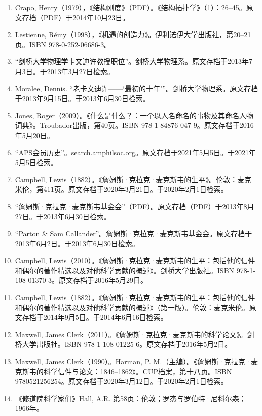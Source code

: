 \begin{enumerate}
\item Crapo, Henry（1979），《结构刚度》（PDF）。《结构拓扑学》（1）：26–45。原文存档（PDF）于2014年10月23日。  
\item Lestienne, Rémy（1998），《机遇的创造力》。伊利诺伊大学出版社，第20–21页。ISBN 978-0-252-06686-3。  
\item “剑桥大学物理学卡文迪许教授职位”。剑桥大学物理系。原文存档于2013年7月3日。于2013年3月27日检索。
\item Moralee, Dennis. “老卡文迪许——‘最初的十年’”。剑桥大学物理系。原文存档于2013年9月15日。于2013年6月30日检索。  
\item Jones, Roger（2009）。《什么是什么？：一个以人名命名的事物及其命名人物词典》。Troubador出版，第40页。ISBN 978-1-84876-047-9。原文存档于2016年5月20日。  
\item “APS会员历史”。search.amphilsoc.org。原文存档于2021年5月5日。于2021年5月5日检索。  
\item Campbell, Lewis（1882）。《詹姆斯·克拉克·麦克斯韦的生平》。伦敦：麦克米伦，第411页。原文存档于2020年3月21日。于2020年2月1日检索。  
\item “詹姆斯·克拉克·麦克斯韦基金会”（PDF）。原文存档（PDF）于2013年8月27日。于2013年6月30日检索。  
\item “Parton & Sam Callander”。詹姆斯·克拉克·麦克斯韦基金会。原文存档于2013年6月2日。于2013年6月30日检索。
\item Campbell, Lewis（2010）。《詹姆斯·克拉克·麦克斯韦的生平：包括他的信件和偶尔的著作精选以及对他科学贡献的概述》。剑桥大学出版社。ISBN 978-1-108-01370-3。原文存档于2016年5月29日。  
\item Campbell, Lewis（1882）。《詹姆斯·克拉克·麦克斯韦的生平：包括他的信件和偶尔的著作精选以及对他科学贡献的概述》（第一版）。伦敦：麦克米伦。原文存档于2014年9月5日。于2014年6月16日检索。  
\item Maxwell, James Clerk（2011）。《詹姆斯·克拉克·麦克斯韦的科学论文》。剑桥大学出版社。ISBN 978-1-108-01225-6。原文存档于2016年5月2日。  
\item Maxwell, James Clerk（1990）。Harman, P. M.（主编）。《詹姆斯·克拉克·麦克斯韦的科学信件与论文：1846–1862》。CUP档案，第十八页。ISBN 9780521256254。原文存档于2020年3月12日。于2020年2月1日检索。  
\item 《修道院科学家们》Hall, A.R. 第58页：伦敦；罗杰与罗伯特·尼科尔森；1966年。
\end{enumerate}